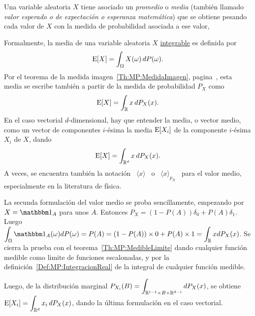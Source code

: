 \label{Sec:MP:esperanzamomento}






\label{Ssec:MP:VectorMedio}


Una  variable aleatoria  $X$  tiene asociado  un  {\it promedio}  o {\it  media}
(tambi\'en  llamado   {\it  valor  esperado  o  de   expectaci\'on  o  esperanza
  matem\'atica})  que se  obtiene pesando  cada valor  de $X$  con la  medida de
probabilidad asociada a ese valor,
%
\begin{definicion}
  Formalmente, la media de  una variable aleatoria $X$ \underline{integrable} es
  definida por
  \[
  \operatorname{E}[X] = \int_\Omega X(\omega) \, dP(\omega).
  \]
  Por    el    teorema    de    la    medida    imagen~\ref{Th:MP:MedidaImagen},
  pagina~\pageref{Th:MP:MedidaImagen}, esta media  se escribe tambi\'en a partir
  de la medida de probabilidad $P_X$ como
  \[
  \operatorname{E}[X] = \int_{\mathbb{R}} x \, dP_X(x).
  \]
  En  el caso vectorial  $d$-dimensional, hay  que entender  la media,  o vector
  medio, como  un vector de componentes  $i$-\'esima la media  $\operatorname{E}[X_i]$ de la
  componente $i$-\'esima $X_i$ de $X$, dando
  \[
  \operatorname{E}[X] = \int_{\mathbb{R}^d} x \, dP_X(x).
  \]
  A veces,  se encuentra  tambi\'en la notaci\'on  \ $\langle  x \rangle$ \  o \
  $\langle  x  \rangle_{p_X}$  \  para  el  valor  medio,  especialmente  en  la
  literatura de f\'isica.
\end{definicion}
%
La secunda formulaci\'on  del valor medio se proba  sencillamente, empezando por
$X = \un_A$ para unos $A$.   Entonces $P_X = (1-P(A)) \delta_0 + P(A) \delta_1$.
Luego  $\displaystyle \int_\Omega  \un_A(\omega)  dP(\omega) =  P(A) =  (1-P(A))
\times 0 +  P(A) \times 1 = \int_\Rset  x dP_X(x)$.  Se cierra la  prueba con el
teorema~\ref{Th:MP:MedibleLimite} dando cualquier  funci\'on medible como limite
de funciones escalonadas,  y por la definici\'on~\ref{Def:MP:IntegracionReal} de
la integral de cualquier funci\'on medible.

Luego,   de    la   distribuci\'on   marginal    $\displaystyle   P_{X_i}(B)   =
\int_{\mathbb{R}^{i-1}   \times   B   \times   \mathbb{R}^{d-i}}  dP_X(x)$,   se   obtiene
$\displaystyle  \operatorname{E}[X_i] = \int_{\mathbb{R}^d}  x_i \,  dP_X(x)$, dando  la \'ultima
formulaci\'on en el caso vectorial.

